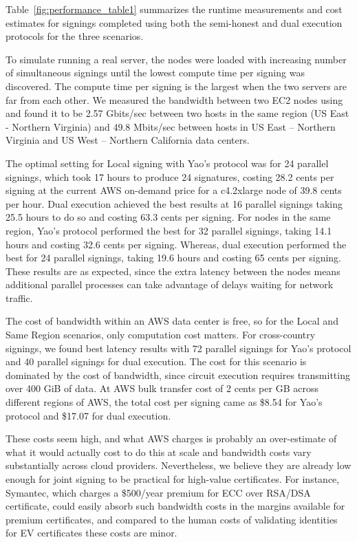 Table~\ref{fig:performance_table1} summarizes the runtime measurements and cost estimates for signings completed using both the semi-honest and dual execution protocols for the three scenarios.

To simulate running a real server, the nodes were loaded with increasing number of simultaneous signings until the lowest compute time per signing was discovered. The compute time per signing is the largest when the two servers are far from each other. We measured the bandwidth between two EC2 nodes using  and found it to be 2.57 Gbits/sec between two hosts in the same region (US East - Northern Virginia) and 49.8 Mbits/sec between hosts in US East -- Northern Virginia and US West -- Northern California data centers. 

The optimal setting for Local signing with Yao's protocol was for 24 parallel signings, which took 17 hours to produce 24 signatures, costing 28.2 cents per signing at the current AWS on-demand price for a c4.2xlarge node of 39.8 cents per hour. Dual execution achieved the best results at 16 parallel signings taking 25.5 hours to do so and costing 63.3 cents per signing. For nodes in the same region, Yao's protocol performed the best for 32 parallel signings, taking 14.1 hours and costing 32.6 cents per signing. Whereas, dual execution performed the best for 24 parallel signings, taking 19.6 hours and costing 65 cents per signing. These results are as expected, since the extra latency between the nodes means additional parallel processes can take advantage of delays waiting for network traffic.

The cost of bandwidth within an AWS data center is free, so for the Local and Same Region scenarios, only computation cost matters. For cross-country signings, we found best  latency results with 72 parallel signings for Yao's protocol and 40 parallel signings for dual execution. The cost for this scenario is dominated by the cost of bandwidth, since circuit execution requires transmitting over 400 GiB of data.
At AWS bulk transfer cost of 2 cents per GB across different regions of AWS, the total cost per signing came as \$8.54 for Yao's protocol and \$17.07 for dual execution. 

These costs seem high, and what AWS charges is probably an over-estimate of what it would actually cost to do this at scale and bandwidth costs vary substantially across cloud providers. Nevertheless, we believe they are already low enough for joint signing to be practical for high-value certificates. For instance, Symantec, which charges a \$500/year premium for ECC over RSA/DSA certificate, could easily absorb such bandwidth costs in the margins available for premium certificates, and compared to the human costs of validating identities for EV certificates these costs are minor.

